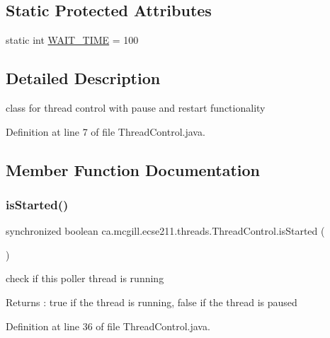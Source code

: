 \subsection*{Static Protected Attributes}
\begin{DoxyCompactItemize}
\item 
static int \hyperlink{classca_1_1mcgill_1_1ecse211_1_1threads_1_1_thread_control_a395cfe1d73b3ef14da0830ed0a499f82}{W\+A\+I\+T\+\_\+\+T\+I\+ME} = 100
\end{DoxyCompactItemize}


\subsection{Detailed Description}
class for thread control with pause and restart functionality 

Definition at line 7 of file Thread\+Control.\+java.



\subsection{Member Function Documentation}
\mbox{\label{classca_1_1mcgill_1_1ecse211_1_1threads_1_1_thread_control_a92f4933511db42476e39956246bcf2fe}} 
\subsubsection{\texorpdfstring{is\+Started()}{isStarted()}}
{\footnotesize\ttfamily synchronized boolean ca.\+mcgill.\+ecse211.\+threads.\+Thread\+Control.\+is\+Started (\begin{DoxyParamCaption}{ }\end{DoxyParamCaption})}

check if this poller thread is running \begin{DoxyReturn}{Returns}
\+: true if the thread is running, false if the thread is paused 
\end{DoxyReturn}


Definition at line 36 of file Thread\+Control.\+java.


